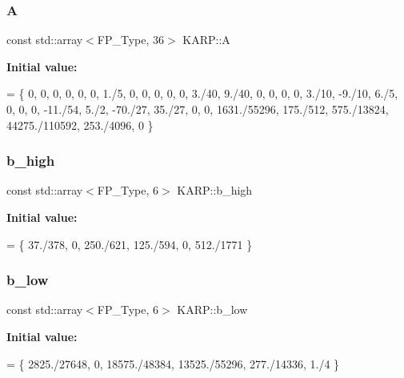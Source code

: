 \subsubsection{\texorpdfstring{A}{A}}
{\footnotesize\ttfamily const std\+::array$<$F\+P\+\_\+\+Type, 36$>$ K\+A\+R\+P\+::A}

{\bfseries Initial value\+:}
\begin{DoxyCode}
= \{
    0,            0,         0,           0,              0,          0,
    1./5,         0,         0,           0,              0,          0,
    3./40,        9./40,     0,           0,              0,          0,
    3./10,        -9./10,    6./5,        0,              0,          0,
    -11./54,      5./2,      -70./27,     35./27,         0,          0,
    1631./55296,  175./512,  575./13824,  44275./110592,  253./4096,  0
  \}
\end{DoxyCode}
\mbox{\label{structKARP_af682eefba6a62bb8bf72efc293e2e361}} 
\subsubsection{\texorpdfstring{b\+\_\+high}{b\_high}}
{\footnotesize\ttfamily const std\+::array$<$F\+P\+\_\+\+Type, 6$>$ K\+A\+R\+P\+::b\+\_\+high}

{\bfseries Initial value\+:}
\begin{DoxyCode}
= \{
    37./378, 0, 250./621, 125./594, 0, 512./1771
  \}
\end{DoxyCode}
\mbox{\label{structKARP_a2833bea5896058e8ad8256a41e4e04d2}} 
\subsubsection{\texorpdfstring{b\+\_\+low}{b\_low}}
{\footnotesize\ttfamily const std\+::array$<$F\+P\+\_\+\+Type, 6$>$ K\+A\+R\+P\+::b\+\_\+low}

{\bfseries Initial value\+:}
\begin{DoxyCode}
= \{
    2825./27648, 0, 18575./48384, 13525./55296, 277./14336, 1./4
  \}
\end{DoxyCode}
\mbox{\label{structKARP_a1b174009b3b9f53824e6d59fc92cb56d}} 
